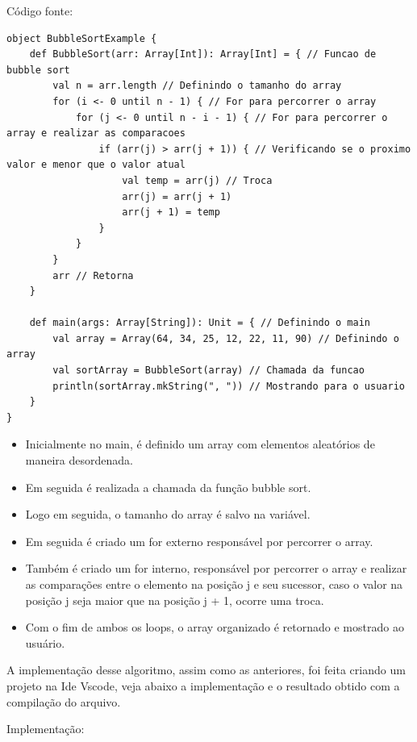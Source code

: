     Código fonte:
    \begin{lstlisting}[breaklines]
object BubbleSortExample {
	def BubbleSort(arr: Array[Int]): Array[Int] = { // Funcao de bubble sort
		val n = arr.length // Definindo o tamanho do array
		for (i <- 0 until n - 1) { // For para percorrer o array
			for (j <- 0 until n - i - 1) { // For para percorrer o array e realizar as comparacoes
				if (arr(j) > arr(j + 1)) { // Verificando se o proximo valor e menor que o valor atual
					val temp = arr(j) // Troca
					arr(j) = arr(j + 1)
					arr(j + 1) = temp
				}
			}
		}
		arr // Retorna
	}
	
	def main(args: Array[String]): Unit = { // Definindo o main
		val array = Array(64, 34, 25, 12, 22, 11, 90) // Definindo o array
		val sortArray = BubbleSort(array) // Chamada da funcao
		println(sortArray.mkString(", ")) // Mostrando para o usuario
	}
}
    \end{lstlisting}

	\begin{itemize}
		\item Inicialmente no main, é definido um array com elementos aleatórios de maneira desordenada.
		
		\item Em seguida é realizada a chamada da função bubble sort.
		
		\item Logo em seguida, o tamanho do array é salvo na variável.
		
		\item Em seguida é criado um for externo responsável por percorrer o array.
		
		\item Também é criado um for interno, responsável por percorrer o array e realizar as comparações entre o elemento na posição j e seu sucessor, caso o valor na posição j seja maior que na posição j + 1, ocorre uma troca.
		
		\item Com o fim de ambos os loops, o array organizado é retornado e mostrado ao usuário.
	\end{itemize}

	A implementação desse algoritmo, assim como as anteriores, foi feita criando um projeto na Ide Vscode, veja abaixo a implementação e o resultado obtido com a compilação do arquivo.
	
	Implementação:

